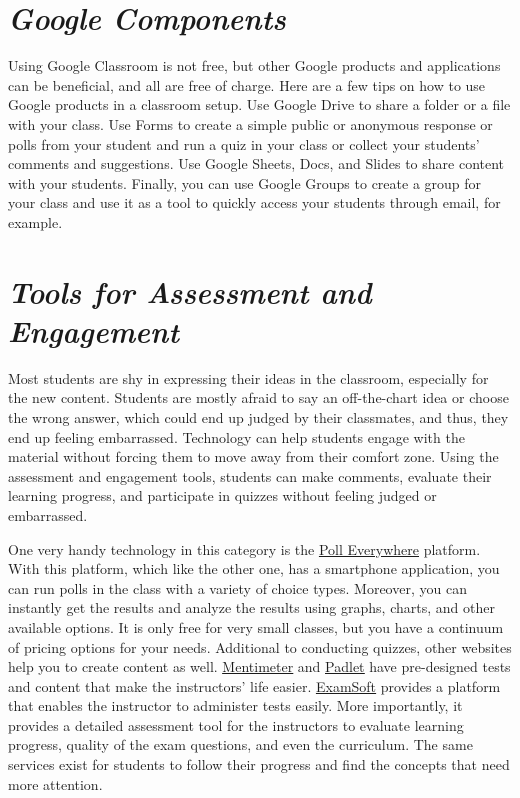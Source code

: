 \documentclass{book}
\begin{document}
\hypertarget{google-components}{%
\section{\texorpdfstring{\emph{Google
Components}}{Google Components}}\label{google-components}}

Using Google Classroom is not free, but other Google products and applications
can be beneficial, and all are free of charge. Here are a few tips on how to
use Google products in a classroom setup. Use Google Drive to share a folder
or a file with your class. Use Forms to create a simple public or anonymous
response or polls from your student and run a quiz in your class or collect
your students' comments and suggestions. Use Google Sheets, Docs, and Slides
to share content with your students. Finally, you can use Google Groups to
create a group for your class and use it as a tool to quickly access your
students through email, for example.

\hypertarget{tools-for-assessment-and-engagement}{%
\section{\texorpdfstring{\emph{Tools for Assessment and
Engagement}}{Tools for Assessment and Engagement}}\label{tools-for-assessment-and-engagement}}

Most students are shy in expressing their ideas in the classroom, especially
for the new content. Students are mostly afraid to say an off-the-chart idea
or choose the wrong answer, which could end up judged by their classmates, and
thus, they end up feeling embarrassed. Technology can help students engage
with the material without forcing them to move away from their comfort zone.
Using the assessment and engagement tools, students can make comments,
evaluate their learning progress, and participate in quizzes without feeling
judged or embarrassed.

One very handy technology in this category is the
\href{https://www.polleverywhere.com/}{\underline{Poll Everywhere}} platform.
With this platform, which like the other one, has a smartphone application,
you can run polls in the class with a variety of choice types. Moreover, you
can instantly get the results and analyze the results using graphs, charts,
and other available options. It is only free for very small classes, but you
have a continuum of pricing options for your needs. Additional to conducting
quizzes, other websites help you to create content as well.
\href{https://www.mentimeter.com/app}{\underline{Mentimeter}} and
\href{https://padlet.com/}{\underline{Padlet}} have pre-designed tests and
content that make the instructors' life easier.
\href{https://examsoft.com/}{\underline{ExamSoft}} provides a platform that
enables the instructor to administer tests easily. More importantly, it
provides a detailed assessment tool for the instructors to evaluate learning
progress, quality of the exam questions, and even the curriculum. The same
services exist for students to follow their progress and find the concepts
that need more attention.
\end{document}
